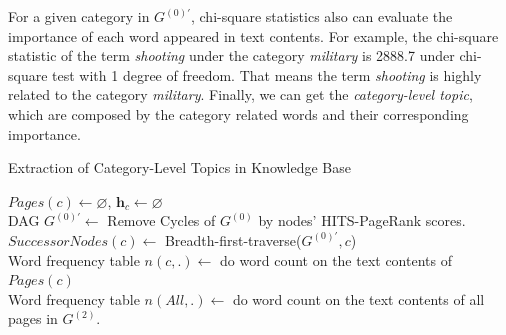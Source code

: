 \documentclass[runningheads,a4paper]{llncs}
\theoremstyle{exampstyle}
\begin{document}
For a given category in \(G^{(0)'}\), chi-square statistics also can evaluate the importance of each word appeared in text contents. 
For example, the chi-square statistic of the term \textit{shooting} under the category \textit{military} is 2888.7 under chi-square test with 1 degree of freedom.
That means the term \textit{shooting} is highly related to the category \textit{military}.  
Finally, we can get the \textit{category-level topic}, which are  composed by the category related words and their corresponding importance.
\setlength{\textfloatsep}{3pt}%
\begin{algorithm}[h]
\scriptsize
\caption{Extraction of Category-Level Topics in Knowledge Base}
\label{alg:normalStatesInit}

\(Pages(c)\leftarrow \varnothing\), \(\bm{h}_c \leftarrow \varnothing\)\\
DAG \(G^{(0)'} \leftarrow\) Remove Cycles of \(G^{(0)}\) by nodes' HITS-PageRank scores. \label{alg:line2inNormalStatesInit}\\
\(SuccessorNodes(c) \leftarrow \) Breadth-first-traverse(\(G^{(0)'},c\))\label{alg:line3inNormalStatesInit}\\
Word frequency table \(n(c,.) \leftarrow \) do word count on the text contents of \(Pages(c)\) \\
Word frequency table \(n(All,.) \leftarrow \) do word count on the text contents of all pages in \(G^{(2)}\).\\
\end{algorithm}
\end{document}
